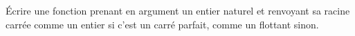 \question{} \'Ecrire une fonction  prenant en argument un entier naturel  et renvoyant sa racine carrée comme un entier si c'est un carré parfait, comme un flottant sinon.